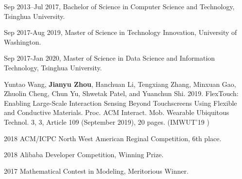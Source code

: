 \begin{resume}


Sep 2013–Jul 2017, Bachelor of Science in Computer Science and Technology, Tsinghua University.

Sep 2017-Aug 2019, Master of Science in Technology Innovation, University of Washington.

Sep 2017-Jan 2020, Master of Science in Data Science and Information Technology, Tsinghua University.

\begin{publications}
    \item Yuntao Wang, \textbf{Jianyu Zhou}, Hanchuan Li, Tengxiang Zhang, Minxuan Gao, Zhuolin Cheng, Chun Yu, Shwetak Patel, and Yuanchun Shi. 2019. FlexTouch: Enabling Large-Scale Interaction Sensing Beyond Touchscreens Using Flexible and Conductive Materials. Proc. ACM Interact. Mob. Wearable Ubiquitous Technol. 3, 3, Article 109 (September 2019), 20 pages. (IMWUT'19 ) 
\end{publications}

\begin{achievements}
\item 2018 ACM/ICPC North West American Reginal Competition, 6th place.
\item 2018 Alibaba Developer Competition, Winning Prize.
\item 2017 Mathematical Contest in Modeling, Meritorious Winner.
\end{achievements}







\end{resume}
